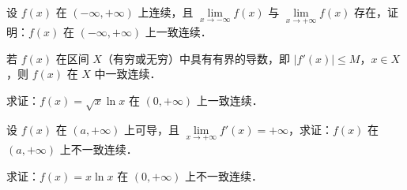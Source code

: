 \begin{xiti}
\item 设 $f(x)$ 在 $(-\infty, +\infty)$ 上连续，且 $\lim\limits_{x \to -\infty} f(x)$ 与 $\lim\limits_{x \to +\infty} f(x)$ 存在，证明：$f(x)$ 在 $(-\infty, +\infty)$ 上一致连续．
\item 若 $f(x)$ 在区间 $X$（有穷或无穷）中具有有界的导数，即 $|f'(x)| \leqslant M$，$x \in X$，则 $f(x)$ 在 $X$ 中一致连续．
\item 求证：$f(x) = \sqrt{x} \ln x$ 在 $(0, +\infty)$ 上一致连续．
\item 设 $f(x)$ 在 $(a, +\infty)$ 上可导，且 $\lim\limits_{x \to +\infty} f'(x) = +\infty$，求证：$f(x)$ 在 $(a, +\infty)$ 上不一致连续．
\item 求证：$f(x) = x \ln x$ 在 $(0, +\infty)$ 上不一致连续．
\end{xiti}
